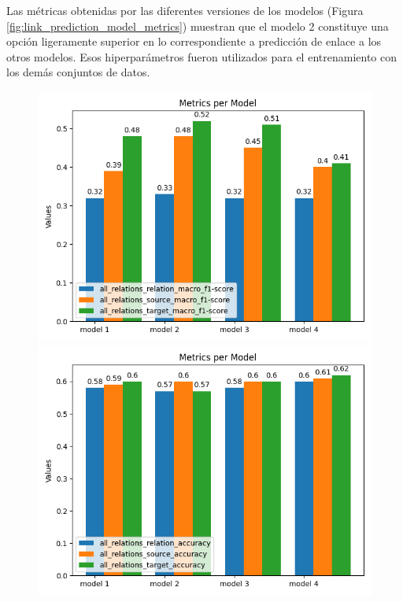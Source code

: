 Las métricas obtenidas por las diferentes versiones de los modelos 
(Figura \ref{fig:link_prediction_model_metrics}) 
muestran que el modelo 2 constituye una opción ligeramente superior en lo correspondiente a 
predicción de enlace a los otros modelos. Esos hiperparámetros
fueron utilizados para el entrenamiento con los demás conjuntos de datos.

\begin{figure}[h!]
	\begin{center}
		\includegraphics[scale=.4]{Graphics/persuasive_essays_all_linked_all_relation_f1_scores.png}
		\includegraphics[scale=.4]{Graphics/persuasive_essays_all_linked_all_relation_accuracy.png}
	\end{center}

\end{figure}
